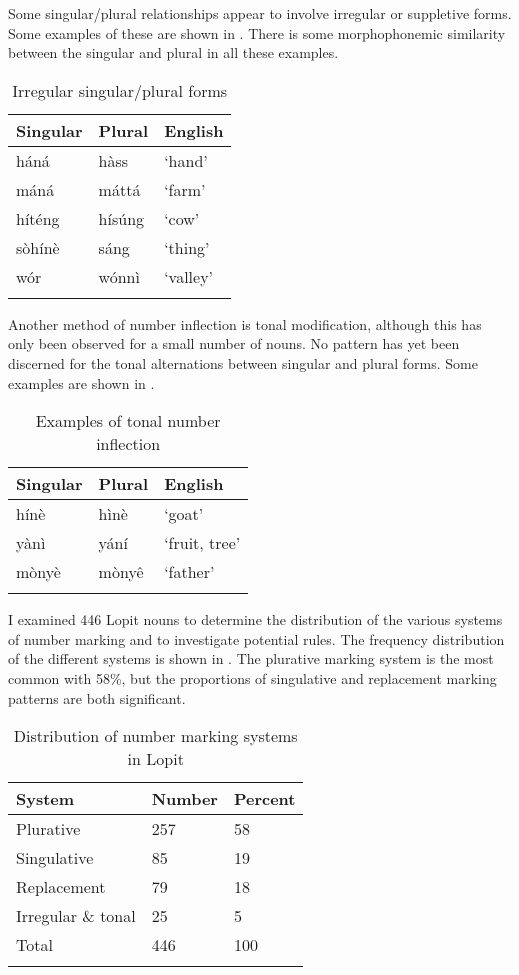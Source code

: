 \documentclass[output=paper]{langsci/langscibook}
\begin{document}
Some singular/plural relationships appear to involve irregular or suppletive forms. Some examples of these are shown in . There is some morphophonemic similarity between the singular and plural in all these examples. 

\begin{table}
\begin{tabularx}{\textwidth}{XXX}
\lsptoprule
  Singular &  Plural &  English\\ \midrule
 háná &  hàss & ‘hand’\\
 máná &  máttá & ‘farm’\\
 híténg &  hísúng & ‘cow’\\
 sòhínè &  sáng & ‘thing’\\
 wór &  wónnì & ‘valley’\\
\lspbottomrule
\end{tabularx}
\caption{Irregular singular/plural forms}
\label{tab:moodie:3}
\end{table}

Another method of number inflection is tonal modification, although this has only been observed for a small number of nouns. No pattern has yet been discerned for the tonal alternations between singular and plural forms. Some examples are shown in .

\begin{table}
\begin{tabularx}{\textwidth}{XXX}
\lsptoprule

  {Singular} &   {Plural} &   {English}\\
\midrule
 hínè &  hìnè &  ‘goat’\\
 yànì &  yání &  ‘fruit, tree’\\
 mònyè &  mòny\^{e} &  ‘father’\\
\lspbottomrule
\end{tabularx}
\caption{Examples of tonal number inflection}
\label{tab:moodie:4}
\end{table}

I examined 446 Lopit nouns to determine the distribution of the various systems of number marking and to investigate potential rules. The frequency distribution of the different systems is shown in . The plurative marking system is the most common with 58\%, but the proportions of singulative and replacement marking patterns are both significant. 

\begin{table}
\begin{tabularx}{\textwidth}{XXX}
\lsptoprule

  {System } &   {Number} &   {Percent}\\ 
\midrule
Plurative & 257 & 58\\
Singulative & 85 & 19\\
Replacement & 79 & 18\\
Irregular \& tonal & 25 & 5\\
\midrule 
Total & 446 & 100\\
\lspbottomrule
\end{tabularx}
\caption{Distribution of number marking systems in Lopit}
\label{tab:moodie:5}
\end{table}
\end{document}
